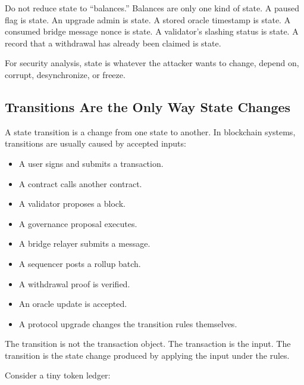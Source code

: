 Do not reduce state to ``balances.'' Balances are only one kind of
state. A paused flag is state. An upgrade admin is state. A stored
oracle timestamp is state. A consumed bridge message nonce is state. A
validator's slashing status is state. A record that a withdrawal has
already been claimed is state.

For security analysis, state is whatever the attacker wants to change,
depend on, corrupt, desynchronize, or freeze.

\subsection{Transitions Are the Only Way State Changes}

A state transition is a change from one state to another. In blockchain
systems, transitions are usually caused by accepted inputs:

\begin{itemize}
\tightlist
\item
  A user signs and submits a transaction.
\item
  A contract calls another contract.
\item
  A validator proposes a block.
\item
  A governance proposal executes.
\item
  A bridge relayer submits a message.
\item
  A sequencer posts a rollup batch.
\item
  A withdrawal proof is verified.
\item
  An oracle update is accepted.
\item
  A protocol upgrade changes the transition rules themselves.
\end{itemize}

The transition is not the transaction object. The transaction is the
input. The transition is the state change produced by applying the input
under the rules.

Consider a tiny token ledger:

